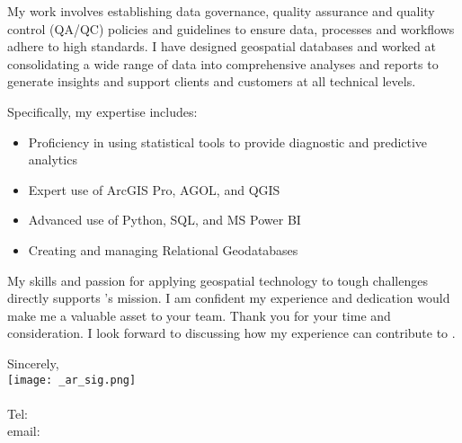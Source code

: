\documentclass[letterpaper]{article}
\newenvironment{itemlist}
        {
            \vspace{-12pt}
            \begin{itemize} \itemsep 0pt
        }{
            \end{itemize}
            \vspace{-3pt}
        }
\begin{document}
My work involves establishing data governance, quality assurance and quality control (QA/QC)
policies and guidelines to ensure data, processes and workflows adhere to high standards.
I have designed geospatial databases and worked at consolidating
a wide range of data into comprehensive analyses and reports to generate
insights and support clients and customers at all technical levels.

Specifically, my expertise includes:
\begin{itemlist}
\item Proficiency in using statistical tools to provide diagnostic and predictive analytics
\item Expert use of ArcGIS Pro, AGOL, and QGIS
\item Advanced use of Python, SQL, and MS Power BI
\item Creating and managing Relational Geodatabases
\end{itemlist}

My skills and passion for applying geospatial technology to tough challenges directly supports {\JobCompany}’s mission.
I am confident my experience and dedication would make me a valuable asset to your team.
Thank you for your time and consideration.
I look forward to discussing how my experience can contribute to {\JobCompany}.

Sincerely,\\
    \hspace{1em}
    \texttt{[image: \_ar\_sig.png]} \\
    \CVsigname \\
    \small
    Tel: \CVphone \\
    email: \CVemail
\end{document}
